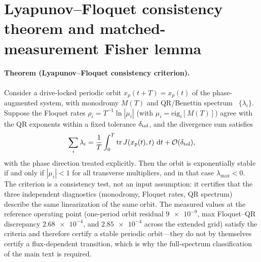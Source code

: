 \documentclass[Phys]{SciPost}
\newcommand{\dd}{\,\mathrm{d}}
\begin{document}
\section{Lyapunov--Floquet consistency theorem and matched-measurement Fisher lemma}
\label{SI-sec:theorems}
\label{SI-sec:theorems}

\paragraph{Theorem (Lyapunov--Floquet consistency criterion).}
Consider a drive-locked periodic orbit $x_p(t+T)=x_p(t)$ of the
phase-augmented system, with monodromy $M(T)$ and QR/Benettin spectrum~\cite{benettin1980,wolf1985,eckmann1985}
$\{\lambda_i\}$. Suppose the Floquet rates $\rho_i=T^{-1}\ln|\mu_i|$ (with
$\mu_i=\mathrm{eig}_i[M(T)]$) agree with the QR exponents within a fixed
tolerance $\delta_{\rm tol}$, and the divergence sum satisfies
\begin{equation}
 \sum_i\lambda_i=\frac1T\int_0^T\operatorname{tr}J(x_p(t),t)\,\dd t
 +\mathcal{O}(\delta_{\rm tol}),
\label{SI-eq:divergence-theorem}
\end{equation}
with the phase direction treated explicitly. Then the orbit is exponentially
stable if and only if $|\mu_i|<1$ for all transverse multipliers, and in that
case $\lambda_{\max}<0$. The criterion is a consistency test, not an input
assumption: it certifies that the three independent diagnostics (monodromy,
Floquet rates, QR spectrum) describe the same linearization of the same
orbit. The measured values at the reference operating point (one-period orbit
residual $\num{9e-9}$, max Floquet--QR discrepancy $\num{2.68e-4}$, and
$\num{2.85e-4}$ across the
extended grid) satisfy the criteria and therefore
certify a stable periodic orbit---they do not by themselves certify a
flux-dependent transition, which is why the full-spectrum classification of the
main text is required.
\end{document}
